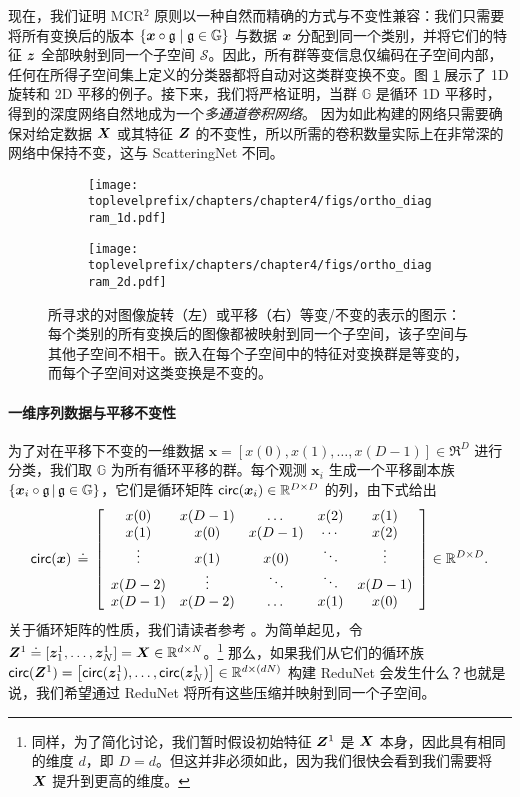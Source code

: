 \documentclass[../../book-main.tex]{subfiles}
\begin{document}
现在，我们证明 MCR$^2$ 原则以一种自然而精确的方式与不变性兼容：我们只需要将所有变换后的版本 $\{\bm{x}\circ \mathfrak{g} \mid \mathfrak{g} \in \mathbb G\}$ 与数据 $\bm{x}$ 分配到同一个类别，并将它们的特征 $\bm{z}$ 全部映射到同一个子空间 $\mathcal S$。因此，所有群等变信息仅编码在子空间内部，任何在所得子空间集上定义的分类器都将自动对这类群变换不变。图 \ref{fig:ortho-invariance-diagram} 展示了 1D 旋转和 2D 平移的例子。接下来，我们将严格证明，当群 $\mathbb G$ 是循环 1D 平移时，得到的深度网络自然地成为一个{\em 多通道卷积网络}。
因为如此构建的网络只需要确保对给定数据 $\bm{X}$ 或其特征 $\bm{Z}$ 的不变性，所以所需的卷积数量实际上在非常深的网络中保持不变，这与 ScatteringNet 不同。

\begin{figure}[t]
    \begin{subfigure}[t]{0.4\textwidth}
        \centering
        \texttt{[image: \\toplevelprefix/chapters/chapter4/figs/ortho\_diagram\_1d.pdf]}
    \end{subfigure}
    \hfill
    \begin{subfigure}[t]{0.4\textwidth}
        \centering
        \texttt{[image: \\toplevelprefix/chapters/chapter4/figs/ortho\_diagram\_2d.pdf]}
    \end{subfigure}
    \caption{所寻求的对图像旋转（左）或平移（右）等变/不变的表示的图示：每个类别的所有变换后的图像都被映射到同一个子空间，该子空间与其他子空间不相干。嵌入在每个子空间中的特征对变换群是等变的，而每个子空间对这类变换是不变的。}\label{fig:ortho-invariance-diagram}
\end{figure}

\paragraph{一维序列数据与平移不变性} 为了对在平移下不变的一维数据 $\bm x = [x(0), x(1), \ldots, x(D-1)] \in \Re^D$ 进行分类，我们取 $\mathbb{G}$ 为所有循环平移的群。每个观测 $\bm x_i$ 生成一个平移副本族 $\{ \bm{x}_i \circ \mathfrak{g} \, | \, \mathfrak{g} \in \mathbb G \}$，它们是循环矩阵 $\mathsf{circ}(\bm x_i) \in \mathbb{R}^{D \times D}$ 的列，由下式给出
\begin{equation}
\mathsf{circ}(\bm{x}) \,\doteq\, \left[ \begin{array}{ccccc} x(0) & x(D-1) & \dots & x(2) & x(1) \\ x(1) & x(0) & x(D-1) & \cdots & x(2) \\ \vdots & x(1) & x(0) &\ddots & \vdots \\ x(D-2) &  \vdots & \ddots & \ddots & x(D-1) \\ x(D-1) & x(D-2) & \dots & x(1) & x(0)   \end{array} \right]  \in \mathbb{R}^{D \times D}.
\end{equation}
关于循环矩阵的性质，我们请读者参考 \cite{Kra2012OnCM}。为简单起见，令 $\bm Z^1 \doteq [ \bm{z}_{1}^1, \dots, \bm{z}_{N}^1 ] = \bm{X} \in \mathbb{R}^{d \times N}$。\footnote{同样，为了简化讨论，我们暂时假设初始特征 $\bm{Z}^1$ 是 $\bm{X}$ 本身，因此具有相同的维度 $d$，即 $D=d$。但这并非必须如此，因为我们很快会看到我们需要将 $\bm{X}$ 提升到更高的维度。} 那么，如果我们从它们的循环族 $\mathsf{circ}(\bm Z^1) = \left[ \mathsf{circ}(\bm{z}_{1}^1), \dots, \mathsf{circ}(\bm{z}_{N}^1) \right] \in \mathbb{R}^{d \times (dN)}$ 构建 ReduNet 会发生什么？也就是说，我们希望通过 ReduNet 将所有这些压缩并映射到同一个子空间。
\end{document}
